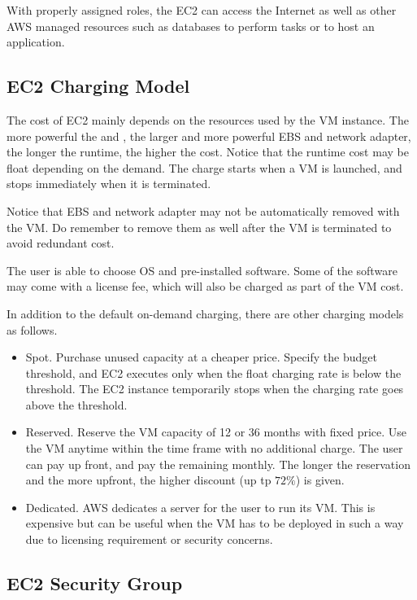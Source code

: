 With properly assigned roles, the EC2 can access the Internet as well as other AWS managed resources such as databases to perform tasks or to host an application.

\subsection{EC2 Charging Model}

The cost of EC2 mainly depends on the resources used by the VM instance. The more powerful the  and , the larger and more powerful EBS and network adapter, the longer the runtime, the higher the cost. Notice that the runtime cost may be float depending on the demand. The charge starts when a VM is launched, and stops immediately when it is terminated. 

Notice that EBS and network adapter may not be automatically removed with the VM. Do remember to remove them as well after the VM is terminated to avoid redundant cost.

The user is able to choose OS and pre-installed software. Some of the software may come with a license fee, which will also be charged as part of the VM cost.

In addition to the default on-demand charging, there are other charging models as follows.
\begin{itemize}
	\item Spot. Purchase unused capacity at a cheaper price. Specify the budget threshold, and EC2 executes only when the float charging rate is below the threshold. The EC2 instance temporarily stops when the charging rate goes above the threshold.
	\item Reserved. Reserve the VM capacity of 12 or 36 months with fixed price. Use the VM anytime within the time frame with no additional charge. The user can pay up front, and pay the remaining monthly. The longer the reservation and the more upfront, the higher discount (up tp $72\%$) is given.
	\item Dedicated. AWS dedicates a server for the user to run its VM. This is expensive but can be useful when the VM has to be deployed in such a way due to licensing requirement or security concerns. 
\end{itemize}

\subsection{EC2 Security Group} \label{ap:aws_ec2_security_group}

